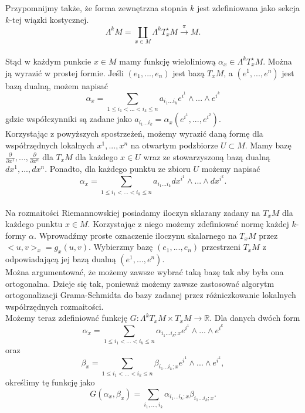 \documentclass[licencjacka]{pracamgr}
\theoremstyle{definition}
\theoremstyle{definition}
\theoremstyle{plain}
\theoremstyle{plain}
\theoremstyle{plain}
\theoremstyle{plain}
\begin{document}
Przypomnijmy także, że forma zewnętrzna stopnia $k$ jest zdefiniowana jako 
sekcja $k$-tej wiązki kostycznej.
\[
    \Lambda^k M = \coprod_{x \in M} 
    \Lambda^k T_x^\star M \xrightarrow{\pi} M.
\] \\

Stąd w każdym punkcie $x \in M$ mamy funkcję wieloliniową $\alpha_x \in
\Lambda^k T_x^\star M$. Można ją wyrazić w prostej formie.
Jeśli $(e_1, ..., e_n)$ jest bazą $T_x M$, a  $(e^1, ..., e^n)$ jest bazą dualną,
możem napisać
\[
    \alpha_x = \sum_{1 \leq i_1 < ... < i_k \leq n} a_{i_1 ... i_k} e^{i^1} \wedge ...
    \wedge e^{i^k}
\] 
gdzie współczynniki są zadane jako
$a_{i_1 ... i_k} = \alpha_x(e^{i^1}, ..., e^{i^2})$. \\

Korzystając z powyższych spostrzeżeń, możemy wyrazić daną formę dla 
współrzędnych lokalnych $x^1, ..., x^n$
na otwartym podzbiorze $U \subset M$.  Mamy bazę
$\frac{\partial}{\partial x^1}, ..., \frac{\partial}{\partial x^n}$ dla $T_x M$
dla każdego $x \in U$ wraz ze stowarzyszoną bazą dualną $dx^1, ..., dx^n$.
Ponadto, dla każdego punktu ze zbioru $U$ możemy napisać
\[
    \alpha_x = \sum_{1 \leq i_1 < ... < i_k \leq n} a_{i_1 ... i_k}
       dx^{i^1} \wedge ...  \wedge dx^{i^k}.
\]  \\

Na rozmaitości Riemannowskiej posiadamy iloczyn sklarany zadany na 
$T_x M$ dla każdego punktu $x \in M$.
Korzystając z niego możemy zdefiniować normę każdej $k$-formy
$\alpha$.  Wprowadźmy proste oznaczenie iloczynu skalarnego na $T_x M$
przez $<u, v>_x = g_x(u, v)$.
Wybierzmy bazę $(e_1, ..., e_n)$ przestrzeni $T_x M$ z odpowiadającą
jej bazą dualną $(e^1, ..., e^n)$. \\

Można argumentować, że możemy zawsze wybrać taką bazę tak aby była ona
ortogonalna.  Dzieje się tak, ponieważ możemy zawsze zastosować
algorytm ortogonalizacji Grama-Schmidta do bazy zadanej przez
różniczkowanie lokalnych współrzędnych rozmaitości. \\

Możemy teraz zdefiniować funkcję
$G: \Lambda^k T_x M \times T_x M \rightarrow \mathbb{R}$.
Dla danych dwóch form
\[
\alpha_x = \sum_{1 \leq i_1 < ... < i_k \leq n} \alpha_{i_1 ... i_k; x} e^{i^1}
\wedge ...  \wedge e^{i^k}
\]
 oraz
\[ \beta_x = \sum_{1 \leq i_1 < ... < i_k \leq n} \beta_{i_1 ... i_k; x} e^{i^1}
\wedge ...  \wedge e^{i^k},
\]
określimy tę funkcję jako
\[
    G(\alpha_x, \beta_x) = \sum_{i_1, ..., i_k} \alpha_{i_1 ... i_k; x}
                                                    \beta_{i_1 ... i_k; x}.
\] \\
\end{document}
